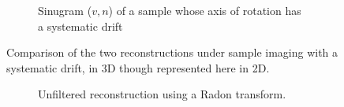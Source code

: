 \begin{figure}
\begin{subfigure}[t]{0.4\textwidth}
    \caption{Sinugram (\(v,n\)) of a sample whose axis of rotation has a systematic drift}\label{fig:flopt_helix_sinugram}
  \end{subfigure}\caption{Comparison of the two reconstructions under sample imaging with a systematic drift, in 3D though represented here in 2D.}\label{fig:flopts}
\end{figure}

\begin{figure}
  \centering
  \begin{subfigure}[t]{0.4\textwidth}
    \caption{Unfiltered reconstruction using a \gls{Radon transform}.} %
    \label{fig:unfilttered_reconstruction_helix_iradon}
  \end{subfigure}~
  \begin{subfigure}[t]{0.4\textwidth}
    \begin{tikzpicture}[node distance=0cm]

\end{tikzpicture}
\end{subfigure}
\end{figure}
